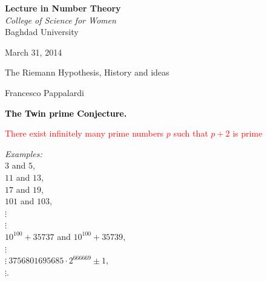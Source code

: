 \documentclass[landscape,display]{powersem} %
\newcommand{\heading}[1]{%
 \begin{center}
  \large\bf
  \shadowbox{{\textcolor{conceptcolor}{#1}}}%
 \end{center}
 \vspace{1ex minus 1ex}}
\begin{document}
\begin{slide}\pagestyle{empty}
\addtocounter{slide}{-1}

\begin{sc}\begin{center}
\small{
\textbf{Lecture in Number Theory}\\ \emph{College of Science for Women}\\ Baghdad University}

March 31, 2014
\vspace*{1cm}

\begin{Large}
\textcolor{underlcolor}{The Riemann Hypothesis, History and ideas}
\end{Large}
\vfill
Francesco Pappalardi
\end{center}
\end{sc}

\vfil


\end{slide}

\begin{slide}
\heading{Some conjectures about prime numbers: 1/5 }\pause

\textcolor{black}{\textbf{The Twin prime Conjecture.}}

\textcolor{red}{There exist infinitely many prime numbers 
$p$ such that $p+2$ is prime}\pause
\vfill

\hspace*{4cm}
\begin{minipage}{7cm}
\textit{Examples:} \\
$3$ and $5$,\\ $11$ and $13$,\\ $17$ and $19$,\\ $101$ and $103,$\\ $\vdots$\\
$\vdots$\\ $10^{100}+35737$ and $10^{100}+35739,$ \\ $\vdots$\\
$\vdots\ 3756801695685\cdot2^{666669} \pm 1,$\\ $\vdots$.
\end{minipage}
\end{slide}
\end{document}
